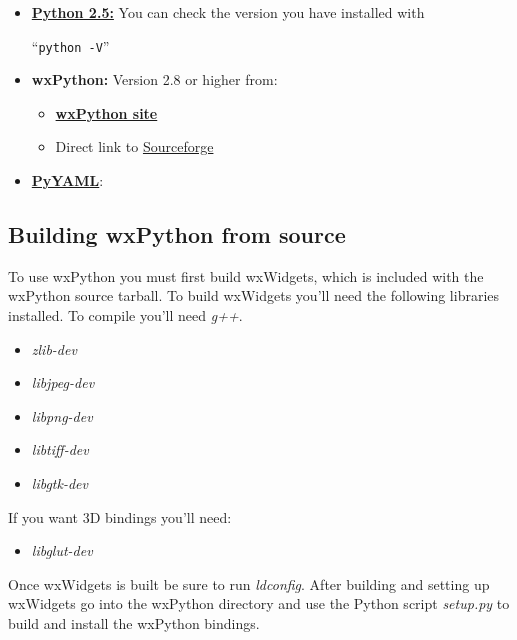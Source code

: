\documentclass[12pt]{article}
\begin{document}
\begin{itemize}
   \item {\href{http://python.org/download/}{\bf Python 2.5:}} You can check the version you have installed with
   
   ``{\tt python -V}''
   
   \item {\bf wxPython:} Version 2.8 or higher from:   
   \begin{itemize}
      \item \href{http://www.wxpython.org/download.php}{\bf wxPython site}
      \item Direct link to \href{https://sourceforge.net/projects/wxpython/files/}{Sourceforge}
   \end{itemize}
   \item \href{http://pyyaml.org/ }{\bf PyYAML}:
\end{itemize}

\subsection*{Building wxPython from source}

To use wxPython you must first build wxWidgets, which is included with the wxPython source tarball. To build wxWidgets you'll need the following libraries installed. To compile you'll need {\it g++}.

\begin{itemize}
   \item {\it zlib-dev}
   \item {\it libjpeg-dev}
   \item {\it libpng-dev}
   \item {\it libtiff-dev}
   \item {\it libgtk-dev}
\end{itemize}

    If you want 3D bindings you'll need: 

\begin{itemize}
   \item {\it libglut-dev}
\end{itemize}

Once wxWidgets is built be sure to run {\it ldconfig}. After building and setting up wxWidgets go into the wxPython directory and use the Python script {\it setup.py} to build and install the wxPython bindings.
\end{document}
